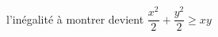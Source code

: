 \documentclass[preview]{standalone}
\begin{document}
\begin{center}
l'inégalité à montrer devient \(\dfrac{x^2}{2}+\dfrac{y^2}{2}\geqslant xy\)
\end{center}
\end{document}
